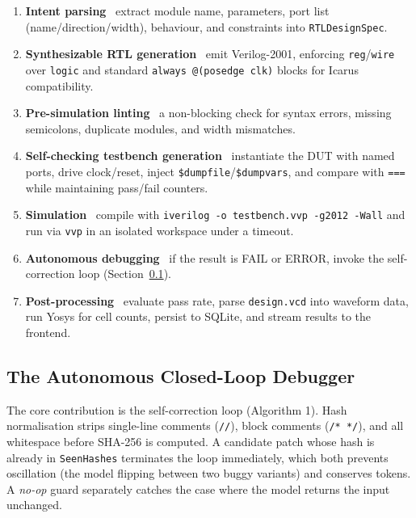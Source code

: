 \documentclass[11pt,a4paper]{article}
\begin{document}
\begin{enumerate}[label=\textbf{Step \arabic*:}]
\item \textbf{Intent parsing} \textemdash\ extract module name, parameters, port list
(name/direction/width), behaviour, and constraints into \texttt{RTLDesignSpec}.
\item \textbf{Synthesizable RTL generation} \textemdash\ emit Verilog-2001, enforcing
\texttt{reg}/\texttt{wire} over \texttt{logic} and standard
\texttt{always @(posedge clk)} blocks for Icarus compatibility.
\item \textbf{Pre-simulation linting} \textemdash\ a non-blocking check for syntax errors,
missing semicolons, duplicate modules, and width mismatches.
\item \textbf{Self-checking testbench generation} \textemdash\ instantiate the DUT with named
ports, drive clock/reset, inject \texttt{\$dumpfile}/\texttt{\$dumpvars}, and
compare with \texttt{===} while maintaining pass/fail counters.
\item \textbf{Simulation} \textemdash\ compile with \texttt{iverilog -o testbench.vvp
-g2012 -Wall} and run via \texttt{vvp} in an isolated workspace under a timeout.
\item \textbf{Autonomous debugging} \textemdash\ if the result is FAIL or ERROR, invoke the
self-correction loop (Section~\ref{sec:loop}).
\item \textbf{Post-processing} \textemdash\ evaluate pass rate, parse \texttt{design.vcd}
into waveform data, run Yosys for cell counts, persist to SQLite, and stream results
to the frontend.
\end{enumerate}

\subsection{The Autonomous Closed-Loop Debugger}
\label{sec:loop}
The core contribution is the self-correction loop (Algorithm 1).
Hash normalisation strips single-line comments (\texttt{//}), block comments
(\texttt{/* */}), and all whitespace before SHA-256 is computed. A candidate patch
whose hash is already in \texttt{SeenHashes} terminates the loop immediately,
which both prevents oscillation (the model flipping between two buggy variants) and
conserves tokens. A \emph{no-op} guard separately catches the case where the model
returns the input unchanged.
\end{document}
